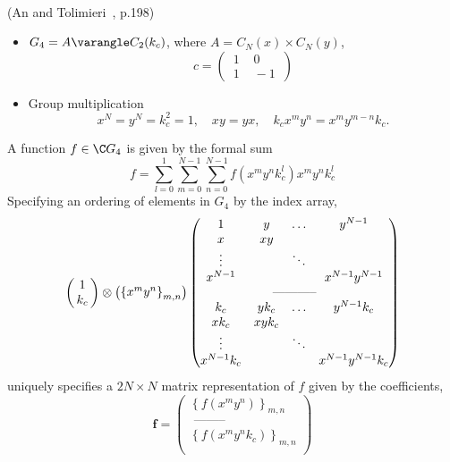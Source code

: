 \begin{example}[Semidirect Product, $G_4 = A \varangle C_2(k_c)$]\\
(An and Tolimieri~\cite{An:2003}, p.198)
\begin{itemize}
\item $G_4 = A \varangle C_2(k_c)$, where $A = C_N(x) \times C_N(y)$,
\[
c =  \begin{pmatrix}
      \,1 \,& \,0\, \\
      \,1\, &\, -1\,
     \end{pmatrix}
\]
\item Group multiplication
\[
x^N = y^N = k_c^2 = 1, \quad xy = yx,\quad k_c x^m y^n = x^m y^{m-n}k_c.
\]
\end{itemize}
A function $f\in \C G_4$ is given by the formal sum
\[ 
 f = \sum_{l=0}^1 \sum_{m=0}^{N-1} \sum_{n=0}^{N-1}
      f(x^m y^n k_c^l)x^m y^n k_c^l
\]
Specifying an ordering of elements in $G_4$ by the index array,
\[
\begin{pmatrix}
\, 1\, \\
\, k_c\,
\end{pmatrix}
                                \otimes 
\begin{pmatrix}
\left\{ x^m y^n \right\}_{m,n}
\end{pmatrix} 
\begin{pmatrix}
1      & y  &  \ldots & y^{N-1} \\
x      & xy &         & \\
\vdots &    & \ddots  &  \\
x^{N-1}&    &         &  x^{N-1} y^{N-1}\\
\multicolumn{4}{c}{ \text{ ----------- } } \\
k_c    & yk_c  & \ldots & y^{N-1}k_c \\
xk_c   & xyk_c &         & \\
\vdots &       & \ddots  &  \\
x^{N-1}k_c&    &         &  x^{N-1} y^{N-1}k_c 
\end{pmatrix}
\]
uniquely specifies a $2N \times N$ matrix representation of $f$ given by the coefficients,
\[
\mathbf{f} = 
\begin{pmatrix}
         \left\{ f(x^m y^n)\right\}_{m,n} \\
\text{ -------- }\\
         \left\{ f(x^m y^n k_c)\right\}_{m,n} \\
\end{pmatrix}
\]
\end{example}
